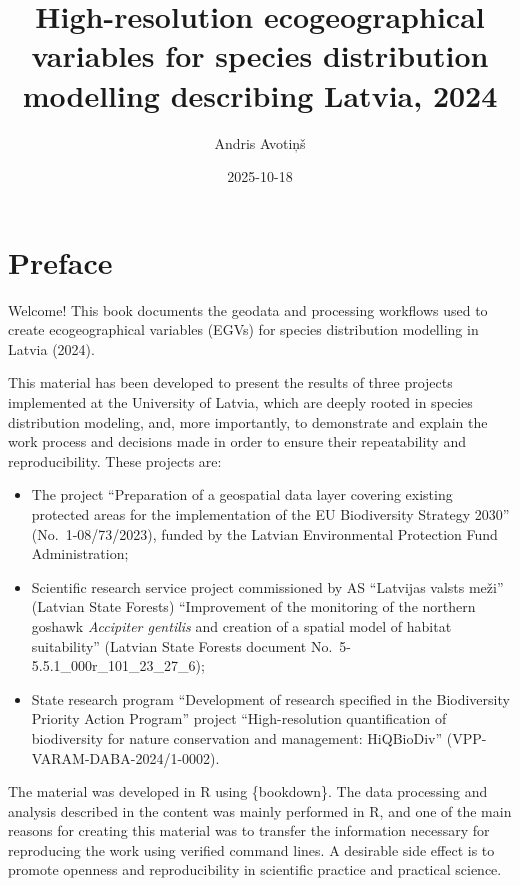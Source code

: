 \documentclass[
]{book}
\title{High-resolution ecogeographical variables for species distribution modelling describing Latvia, 2024}
\author{Andris Avotiņš}
\date{2025-10-18}
\begin{document}
\maketitle

{
\setcounter{tocdepth}{1}
\tableofcontents
}
\chapter*{Preface}\label{preface}

Welcome! This book documents the geodata and processing workflows used to create
ecogeographical variables (EGVs) for species distribution modelling in Latvia (2024).

This material has been developed to present the results of three projects
implemented at the University of Latvia, which are deeply rooted in species
distribution modeling, and, more importantly, to demonstrate and explain the
work process and decisions made in order to ensure their repeatability and
reproducibility. These projects are:

\begin{itemize}
\item
  The project ``Preparation of a geospatial data layer covering existing
  protected areas for the implementation of the EU Biodiversity Strategy
  2030'' (No.~1-08/73/2023), funded by the Latvian Environmental Protection Fund
  Administration;
\item
  Scientific research service project commissioned by AS ``Latvijas valsts
  meži'' (Latvian State Forests) ``Improvement of the monitoring of the northern
  goshawk \emph{Accipiter gentilis} and creation of a spatial model of habitat
  suitability'' (Latvian State Forests document No.~5-5.5.1\_000r\_101\_23\_27\_6);
\item
  State research program ``Development of research specified in the Biodiversity
  Priority Action Program'' project ``High-resolution quantification of biodiversity
  for nature conservation and management: HiQBioDiv'' (VPP-VARAM-DABA-2024/1-0002).
\end{itemize}

The material was developed in R using \{bookdown\}. The data processing and analysis
described in the content was mainly performed in R, and one of the main reasons
for creating this material was to transfer the information necessary for
reproducing the work using verified command lines. A desirable side effect
is to promote openness and reproducibility in scientific practice and practical
science.
\end{document}

